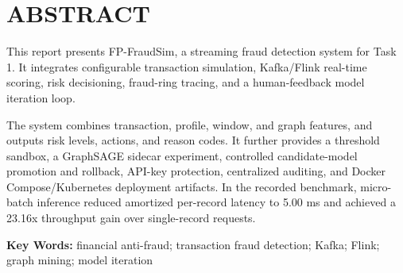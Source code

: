 \section*{\centering\bfseries{}ABSTRACT}

\vspace{0.5cm}

This report presents FP-FraudSim, a streaming fraud detection system for Task 1. It integrates configurable transaction simulation, Kafka/Flink real-time scoring, risk decisioning, fraud-ring tracing, and a human-feedback model iteration loop.

The system combines transaction, profile, window, and graph features, and outputs risk levels, actions, and reason codes. It further provides a threshold sandbox, a GraphSAGE sidecar experiment, controlled candidate-model promotion and rollback, API-key protection, centralized auditing, and Docker Compose/Kubernetes deployment artifacts. In the recorded benchmark, micro-batch inference reduced amortized per-record latency to 5.00 ms and achieved a 23.16x throughput gain over single-record requests.

\noindent\textbf{Key Words: }financial anti-fraud; transaction fraud detection; Kafka; Flink; graph mining; model iteration
